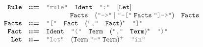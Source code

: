 \documentclass[class={IEEEtran}]{standalone}
\newcommand{\Term}[1]{\text{\ttfamily #1}}
\newcommand{\TermBF}[1]{\text{\ttfamily \textbf{#1}}}
\newcommand{\String}[1]{\text{\textcolor{gray}{\ttfamily "#1"}}}
\begin{document}
$
\begin{array}{rcl}
    \TermBF{Rule}   &\bm{::=}& \String{rule} \quad \Term{Ident} \quad \String{:} \quad [\Term{Let}]\\
                    &   & \hspace{3.5em} \Term{Facts} \quad (\String{-->} \; | \; \String{--[} \; \Term{Facts} \; \String{]->}) \quad \Term{Facts} \\
    \TermBF{Facts}  &\bm{::=}& \String{[} \quad \Term{Fact} \quad (\String{,} \quad \Term{Fact})^* \quad \String{]}  \\
    \TermBF{Fact}   &\bm{::=}& \Term{Ident} \quad \String{(} \quad \Term{Term} \quad (\String{,} \quad \Term{Term})^* \quad \String{)}  \\
    \TermBF{Let}    &\bm{::=}& \String{let} \quad ( \Term{Term} \; \String{=} \; \Term{Term} )^+ \quad \String{in}\\
\end{array}
$
\end{document}
